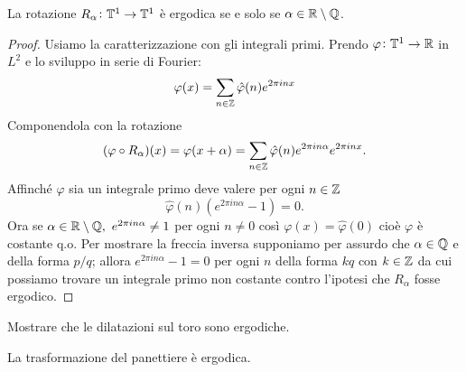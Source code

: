 \begin{proposition}
    La rotazione $ R_\alpha \colon \mathbb{T}^1 \to \mathbb{T}^1 $ è ergodica se e solo se $ \alpha \in \mathbb{R} \setminus \mathbb{Q} $. 
\end{proposition}
\begin{proof}
    Usiamo la caratterizzazione con gli integrali primi. Prendo $ \varphi \colon \mathbb{T}^1 \to \mathbb{R} $ in $ L^2 $ e lo sviluppo in serie di Fourier:
    \[
        \varphi(x) = \sum_{n \in \mathbb{Z}} \hat{\varphi}(n) e^{2\pi i n x}
    \]
    Componendola con la rotazione
    \[
        (\varphi \circ R_\alpha)(x) = \varphi(x + \alpha) = \sum_{n \in \mathbb{Z}} \hat{\varphi}(n) e^{2\pi i n \alpha} e^{2\pi i n x}.
    \]
    Affinché $ \varphi $ sia un integrale primo deve valere per ogni $ n \in \mathbb{Z} $
    \[
        \hat{\varphi}(n) \left(e^{2\pi i n \alpha} - 1 \right) = 0.
    \]
    Ora se $ \alpha \in \mathbb{R} \setminus \mathbb{Q}, \ e^{2\pi i n \alpha} \neq 1 $ per ogni $ n \neq 0 $ così $ \varphi(x) = \hat{\varphi}(0) $ cioè $ \varphi $ è costante q.o. Per mostrare la freccia inversa supponiamo per assurdo che $ \alpha \in \mathbb{Q} $ e della forma $ p/q $; allora $ e^{2\pi i n \alpha} - 1 = 0 $ per ogni $ n $ della forma $ kq $ con $ k \in \mathbb{Z} $ da cui possiamo trovare un integrale primo non costante contro l'ipotesi che $ R_\alpha $ fosse ergodico. 
\end{proof}

\begin{exercise}
    Mostrare che le dilatazioni sul toro sono ergodiche.
\end{exercise}

\begin{exercise}
    La trasformazione del panettiere è ergodica. 
\end{exercise}

